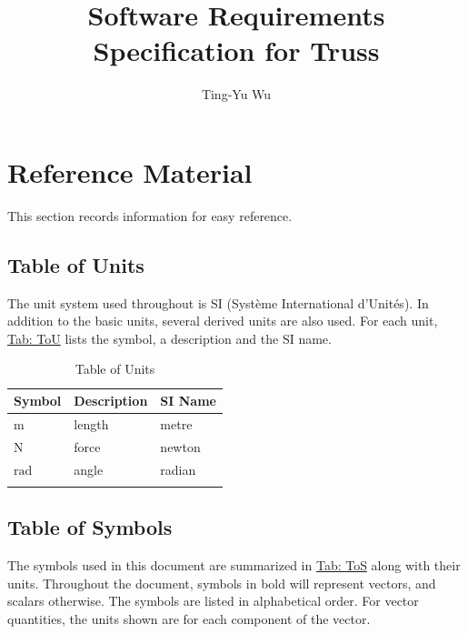 \documentclass[12pt]{article}
\title{Software Requirements Specification for Truss}
\author{Ting-Yu Wu}
\begin{document}
\maketitle
\tableofcontents
\newpage
\section{Reference Material}
\label{Sec:RefMat}
This section records information for easy reference.

\subsection{Table of Units}
\label{Sec:ToU}
The unit system used throughout is SI (Système International d'Unités). In addition to the basic units, several derived units are also used. For each unit, \hyperref[Table:ToU]{Tab: ToU} lists the symbol, a description and the SI name.

\begin{longtable}{l l l}
\toprule
\textbf{Symbol} & \textbf{Description} & \textbf{SI Name}
\\
\midrule
\endhead
${\text{m}}$ & length & metre
\\
${\text{N}}$ & force & newton
\\
${\text{rad}}$ & angle & radian
\\
\bottomrule
\caption{Table of Units}
\label{Table:ToU}
\end{longtable}
\subsection{Table of Symbols}
\label{Sec:ToS}
The symbols used in this document are summarized in \hyperref[Table:ToS]{Tab: ToS} along with their units. Throughout the document, symbols in bold will represent vectors, and scalars otherwise. The symbols are listed in alphabetical order. For vector quantities, the units shown are for each component of the vector.
\end{document}
